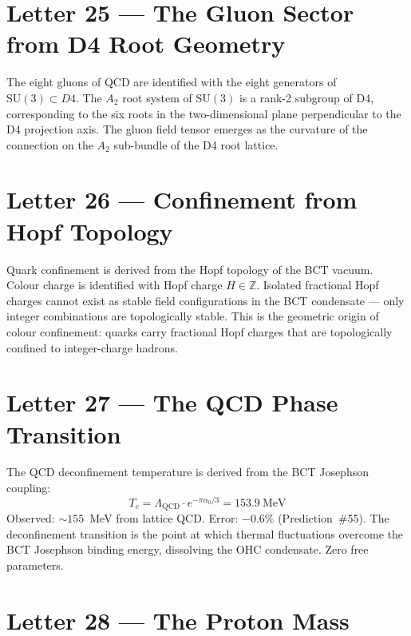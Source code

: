 \documentclass[aps,prl,twocolumn,showpacs,preprintnumbers]{revtex4-2}
\newcommand{\LQCD}{\Lambda_{\mathrm{QCD}}}
\begin{document}
\section{Letter 25 --- The Gluon Sector from D4 Root Geometry}

\medskip
The eight gluons of QCD are identified with the eight generators of
$\mathrm{SU}(3) \subset D4$. The $A_2$ root system of $\mathrm{SU}(3)$
is a rank-2 subgroup of D4, corresponding to the six roots in the
two-dimensional plane perpendicular to the D4 projection axis.
The gluon field tensor emerges as the curvature of the connection on
the $A_2$ sub-bundle of the D4 root lattice.

\section{Letter 26 --- Confinement from Hopf Topology}

\medskip
Quark confinement is derived from the Hopf topology of the BCT vacuum.
Colour charge is identified with Hopf charge $H \in \mathbb{Z}$.
Isolated fractional Hopf charges cannot exist as stable field configurations
in the BCT condensate --- only integer combinations are topologically
stable. This is the geometric origin of colour confinement: quarks
carry fractional Hopf charges that are topologically confined to
integer-charge hadrons.

\section{Letter 27 --- The QCD Phase Transition}

\medskip
The QCD deconfinement temperature is derived from the BCT Josephson
coupling:
\begin{equation}
T_c = \LQCD \cdot e^{-\pi\alpha_0/3} = 153.9~\mathrm{MeV}
\end{equation}
Observed: $\sim 155$~MeV from lattice QCD. Error: $-0.6\%$
(Prediction~\#55). The deconfinement transition is the point at
which thermal fluctuations overcome the BCT Josephson binding energy,
dissolving the OHC condensate. Zero free parameters.

\section{Letter 28 --- The Proton Mass}
\end{document}
